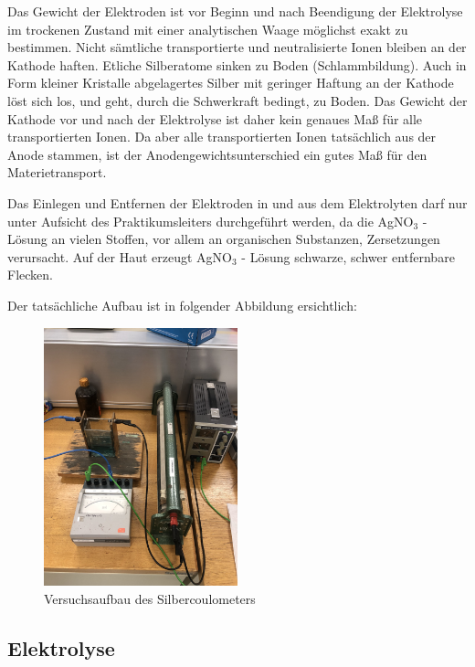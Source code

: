 \documentclass[11pt,ngerman]{scrartcl}
\begin{document}
Das Gewicht der Elektroden ist vor Beginn und nach Beendigung der Elektrolyse im trockenen
Zustand mit einer analytischen Waage möglichst exakt zu bestimmen. Nicht sämtliche transportierte
und neutralisierte Ionen bleiben an der Kathode haften. Etliche Silberatome sinken
zu Boden (Schlammbildung). Auch in Form kleiner Kristalle abgelagertes Silber mit geringer
Haftung an der Kathode löst sich los, und geht, durch die Schwerkraft bedingt, zu Boden. Das
Gewicht der Kathode vor und nach der Elektrolyse ist daher kein genaues Maß für alle transportierten
Ionen. Da aber alle transportierten Ionen tatsächlich aus der Anode stammen, ist der
Anodengewichtsunterschied ein gutes Maß für den Materietransport.

Das Einlegen und Entfernen der Elektroden in und aus dem Elektrolyten darf nur unter Aufsicht
des Praktikumsleiters durchgeführt werden, da die AgNO$_3$ - Lösung an vielen Stoffen, vor
allem an organischen Substanzen, Zersetzungen verursacht. Auf der Haut erzeugt AgNO$_3$ - Lösung
schwarze, schwer entfernbare Flecken.

\vspace{2mm}

Der tatsächliche Aufbau ist in folgender Abbildung ersichtlich:

\begin{figure}[H]
	\begin{center}
		\includegraphics[angle=-90,width=0.5\textwidth]{aufbau_ag}
	\end{center}
	\caption{Versuchsaufbau des Silbercoulometers}
	\label{fig:aufbau_ag}
\end{figure}


\subsection{Elektrolyse}
\end{document}
